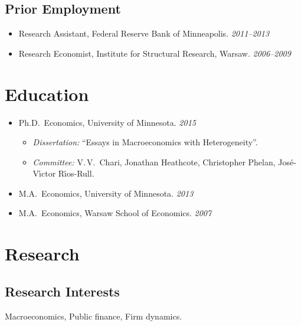 \documentclass[letterpaper]{article}
\newcommand{\dt}[1]{\hfill\textit{#1}}
\begin{document}
\subsection*{Prior Employment}
\begin{itemize}
\item Research Assistant, Federal Reserve Bank of Minneapolis. \dt{2011--2013}
\item Research Economist, Institute for Structural Research, Warsaw. \dt{2006--2009}
\end{itemize}

\section*{Education}
\begin{itemize}
\item Ph.D.\ Economics, University of Minnesota. \dt{2015}
  \begin{itemize}
  \item[] \emph{Dissertation:} ``Essays in Macroeconomics with Heterogeneity''.
  \item[] \emph{Committee:} V.\,V.\ Chari, Jonathan Heathcote, Christopher Phelan, Jos\'e-V\'{\i}ctor R\'{\i}os-Rull.
  \end{itemize}
\item M.A.\ Economics, University of Minnesota. \dt{2013}
\item M.A.\ Economics, Warsaw School of Economics. \dt{2007}
\end{itemize}

\section*{Research}

\subsection*{Research Interests}
Macroeconomics, Public finance, Firm dynamics.
\end{document}
